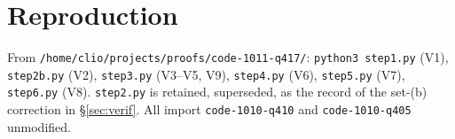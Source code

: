 \documentclass[11pt]{article}
\theoremstyle{plain}
\theoremstyle{definition}
\begin{document}
\appendix
\section{Reproduction}
From \texttt{/home/clio/projects/proofs/code-1011-q417/}:
\texttt{python3 step1.py} (V1), \texttt{step2b.py} (V2), \texttt{step3.py} (V3--V5, V9),
\texttt{step4.py} (V6), \texttt{step5.py} (V7), \texttt{step6.py} (V8).
\texttt{step2.py} is retained, superseded, as the record of the set-(b) correction in \S\ref{sec:verif}.
All import \texttt{code-1010-q410} and \texttt{code-1010-q405} unmodified.
\end{document}
